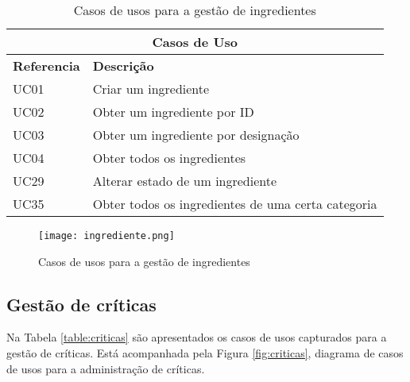 \begin{table}[H]
\caption{Casos de usos para a gestão de ingredientes}
\label{table:ingredientes}
\begin{center}
\begin{tabular}{ |p{2cm}|p{10cm}|  }
\hline
\multicolumn{2}{|c|}{Casos de Uso} \\
\hline
\textbf{Referencia} & \textbf{Descrição} \\
\hline
UC01 & Criar um ingrediente\\
\hline
UC02 & Obter um ingrediente por ID\\
\hline
UC03 & Obter um ingrediente por designação\\
\hline
UC04 & Obter todos os ingredientes\\
\hline
UC29 & Alterar estado de um ingrediente\\
\hline
UC35 & Obter todos os ingredientes de uma certa categoria\\

\hline
\end{tabular} 
\end{center}
\end{table}

\begin{figure}[H]
    \centering
    \texttt{[image: ingrediente.png]}
    \caption{Casos de usos para a gestão de ingredientes}
    \label{fig:ingrediente}
\end{figure}
\newpage

\subsection{Gestão de críticas}

Na Tabela \ref{table:criticas} são apresentados os casos de usos capturados para a gestão de críticas. Está acompanhada pela Figura \ref{fig:criticas}, diagrama de casos de usos para a administração de críticas.

